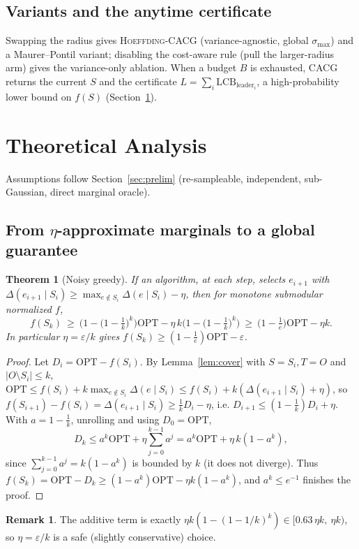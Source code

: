 \documentclass[11pt]{article}
\theoremstyle{plain}
\newtheorem{theorem}{Theorem}
\theoremstyle{definition}
\newtheorem{remark}{Remark}
\newcommand{\OPT}{\mathrm{OPT}}
\newcommand{\LCB}{\mathrm{LCB}}
\newcommand{\marg}[2]{\Delta(#1\mid #2)}
\begin{document}
\subsection{Variants and the anytime certificate}
Swapping the radius gives \textsc{Hoeffding}-CACG (variance-agnostic,
global $\sigma_{\max}$) and a Maurer--Pontil variant; disabling the
cost-aware rule (pull the larger-radius arm) gives the variance-only
ablation. When a budget $B$ is exhausted, CACG returns the current $S$ and
the certificate $L=\sum_i\LCB_{\text{leader}_i}$, a high-probability lower
bound on $f(S)$ (Section~\ref{sec:analysis}).

\section{Theoretical Analysis}\label{sec:analysis}
Assumptions follow Section~\ref{sec:prelim} (re-sampleable, independent,
sub-Gaussian, direct marginal oracle).

\subsection{From \texorpdfstring{$\eta$}{eta}-approximate marginals to a global guarantee}
\begin{theorem}[Noisy greedy]\label{thm:eta}
If an algorithm, at each step, selects $e_{i+1}$ with
$\marg{e_{i+1}}{S_i}\ge\max_{e\notin S_i}\marg{e}{S_i}-\eta$, then for
monotone submodular normalized $f$,
\[
f(S_k)\ \ge\ \Big(1-\big(1-\tfrac1k\big)^k\Big)\OPT
        -\eta\,k\Big(1-\big(1-\tfrac1k\big)^k\Big)
        \ \ge\ \big(1-\tfrac1e\big)\OPT-\eta k.
\]
In particular $\eta=\varepsilon/k$ gives $f(S_k)\ge(1-\tfrac1e)\OPT-\varepsilon$.
\end{theorem}
\begin{proof}
Let $D_i=\OPT-f(S_i)$. By Lemma~\ref{lem:cover} with $S=S_i,T=O$ and
$|O\setminus S_i|\le k$,
$\OPT\le f(S_i)+k\max_{e\notin S_i}\marg{e}{S_i}
      \le f(S_i)+k(\marg{e_{i+1}}{S_i}+\eta)$,
so $f(S_{i+1})-f(S_i)=\marg{e_{i+1}}{S_i}\ge\tfrac1k D_i-\eta$, i.e.
$D_{i+1}\le(1-\tfrac1k)D_i+\eta$. With $a=1-\tfrac1k$, unrolling and using
$D_0=\OPT$,
\[
D_k\le a^k\OPT+\eta\sum_{j=0}^{k-1}a^j
    =a^k\OPT+\eta\,k(1-a^k),
\]
since $\sum_{j=0}^{k-1}a^j=k(1-a^k)$ is bounded by $k$ (it does not
diverge). Thus $f(S_k)=\OPT-D_k\ge(1-a^k)\OPT-\eta k(1-a^k)$, and
$a^k\le e^{-1}$ finishes the proof.
\end{proof}
\begin{remark}
The additive term is exactly $\eta k(1-(1-1/k)^k)\in[0.63\,\eta k,\ \eta k)$,
so $\eta=\varepsilon/k$ is a safe (slightly conservative) choice.
\end{remark}
\end{document}

